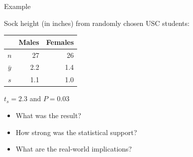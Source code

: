 \begin{frame}{Example}

    Sock height (in inches) from randomly chosen USC students:
  \begin{center}
    \begin{tabular}{crr}
       & Males & Females \\
       \hline
       $n$ & 27 & 26 \\
       $\bar y$ & 2.2 & 1.4 \\
       $s$ & 1.1 & 1.0
     \end{tabular}

     \vspace{1em}

     $t_s=2.3$ and $P=0.03$
 \end{center}

     \begin{itemize}
        \item \alert{What was the result?} \\
        \item \alert{How strong was the statistical support?} \\
        \item \alert{What are the real-world implications?} \\
     \end{itemize}

\end{frame}

